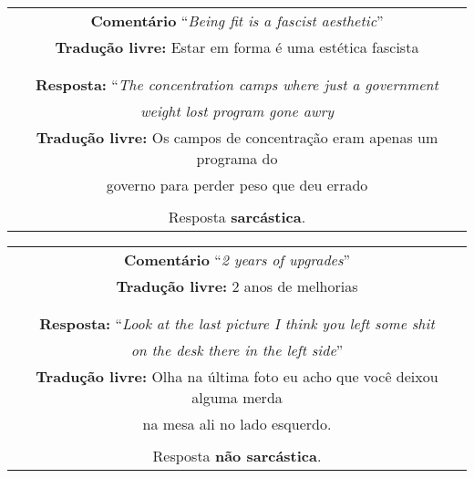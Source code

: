\begin{center}
\begin{tabular}{|c|}

\hline

\textbf{Comentário} ``\textit{Being fit is a fascist aesthetic}'' \\

\textbf{Tradução livre:} Estar em forma é uma estética fascista \\ \\

\hline

\\

\textbf{Resposta:} ``\textit{The concentration camps where just a government} \\
\textit{weight lost program gone awry} \\

\textbf{Tradução livre:} Os campos de concentração eram apenas um programa do \\
governo para perder peso que deu errado \\ \\

Resposta \textbf{sarcástica}.

\\ \hline

\end{tabular}
\end{center}

\begin{center}
\begin{tabular}{|c|}

\hline

\textbf{Comentário} ``\textit{2 years of upgrades}'' \\

\textbf{Tradução livre:} 2 anos de melhorias \\ \\

\hline

\\

\textbf{Resposta:} ``\textit{Look at the last picture I think you left some shit} \\
\textit{on the desk there in the left side}'' \\

\textbf{Tradução livre:} Olha na última foto eu acho que você deixou alguma merda \\
na mesa ali no lado esquerdo. \\ \\

Resposta \textbf{não sarcástica}.

\\ \hline

\end{tabular}
\end{center}

